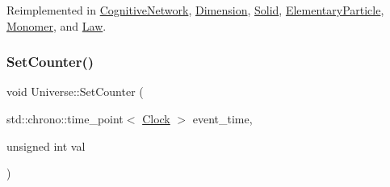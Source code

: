 Reimplemented in \mbox{\hyperlink{classCognitiveNetwork_a99f801aeca299186cc706696696749b1}{Cognitive\+Network}}, \mbox{\hyperlink{classDimension_a6d3f7fa4a26b92d8ae6161a1b8bb8220}{Dimension}}, \mbox{\hyperlink{classSolid_a37503e6b25f912254414e778af2e75cd}{Solid}}, \mbox{\hyperlink{classElementaryParticle_abbc6d3c58509c4121df55bfef716d2f1}{Elementary\+Particle}}, \mbox{\hyperlink{classMonomer_a1ee35c888318e590082e6cd1772bb430}{Monomer}}, and \mbox{\hyperlink{classLaw_a2e780573f6285f88d167d45a2e243d01}{Law}}.

\mbox{\label{classUniverse_aa22202ae740eb1355529afcb13285e91}} 
\subsubsection{\texorpdfstring{Set\+Counter()}{SetCounter()}}
{\footnotesize\ttfamily void Universe\+::\+Set\+Counter (\begin{DoxyParamCaption}\item[{std\+::chrono\+::time\+\_\+point$<$ \mbox{\hyperlink{universe_8h_a0ef8d951d1ca5ab3cfaf7ab4c7a6fd80}{Clock}} $>$}]{event\+\_\+time,  }\item[{unsigned int}]{val }\end{DoxyParamCaption})\hspace{0.3cm}{\ttfamily [virtual]}}




